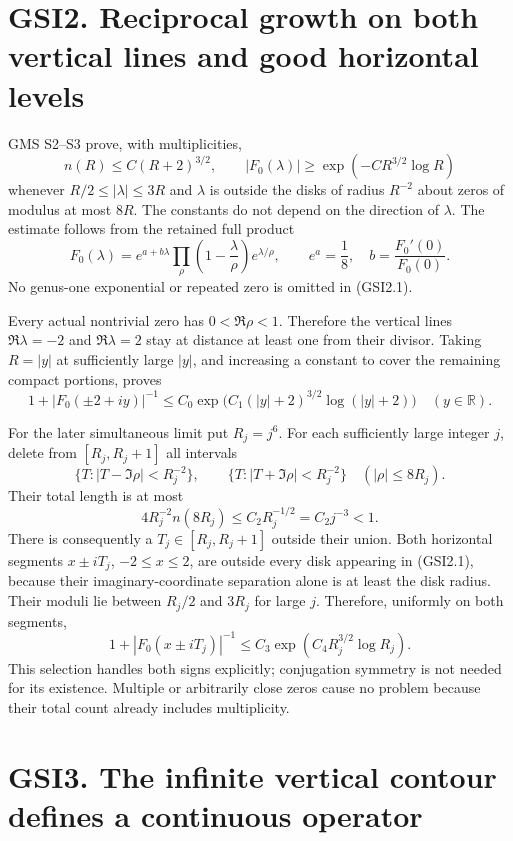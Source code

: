 \section{GSI2. Reciprocal growth on both vertical lines and good
horizontal
levels}\label{gsi2.-reciprocal-growth-on-both-vertical-lines-and-good-horizontal-levels}

GMS S2--S3 prove, with multiplicities, \[
n(R)\le C(R+2)^{3/2},\qquad
|F_0(\lambda)|\ge\exp(-C R^{3/2}\log R)
\tag{GSI2.1}
\] whenever \(R/2\le|\lambda|\le3R\) and \(\lambda\) is outside the
disks of radius \(R^{-2}\) about zeros of modulus at most \(8R\). The
constants do not depend on the direction of \(\lambda\). The estimate
follows from the retained full product \[
F_0(\lambda)=e^{a+b\lambda}
\prod_{\rho}\left(1-\frac\lambda\rho\right)e^{\lambda/\rho},
\qquad e^a=\frac18,\quad b=\frac{F_0'(0)}{F_0(0)}.
\tag{GSI2.2}
\] No genus-one exponential or repeated zero is omitted in (GSI2.1).

Every actual nontrivial zero has \(0<\Re\rho<1\). Therefore the vertical
lines \(\Re\lambda=-2\) and \(\Re\lambda=2\) stay at distance at least
one from their divisor. Taking \(R=|y|\) at sufficiently large \(|y|\),
and increasing a constant to cover the remaining compact portions,
proves \[
1+|F_0(\pm2+iy)|^{-1}
\le C_0\exp\bigl(C_1(|y|+2)^{3/2}\log(|y|+2)\bigr)
\quad(y\in\mathbb R).
\tag{GSI2.3}
\]

For the later simultaneous limit put \(R_j=j^6\). For each sufficiently
large integer \(j\), delete from \([R_j,R_j+1]\) all intervals \[
\{T:|T-\Im\rho|<R_j^{-2}\},\qquad
\{T:|T+\Im\rho|<R_j^{-2}\}
\quad(|\rho|\le8R_j).
\tag{GSI2.4}
\] Their total length is at most \[
4R_j^{-2}n(8R_j)\le C_2R_j^{-1/2}=C_2j^{-3}<1.
\tag{GSI2.5}
\] There is consequently a \(T_j\in[R_j,R_j+1]\) outside their union.
Both horizontal segments \(x\pm iT_j\), \(-2\le x\le2\), are outside
every disk appearing in (GSI2.1), because their imaginary-coordinate
separation alone is at least the disk radius. Their moduli lie between
\(R_j/2\) and \(3R_j\) for large \(j\). Therefore, uniformly on both
segments, \[
1+|F_0(x\pm iT_j)|^{-1}
\le C_3\exp(C_4R_j^{3/2}\log R_j).
\tag{GSI2.6}
\] This selection handles both signs explicitly; conjugation symmetry is
not needed for its existence. Multiple or arbitrarily close zeros cause
no problem because their total count already includes multiplicity.

\section{GSI3. The infinite vertical contour defines a continuous
operator}\label{gsi3.-the-infinite-vertical-contour-defines-a-continuous-operator}

